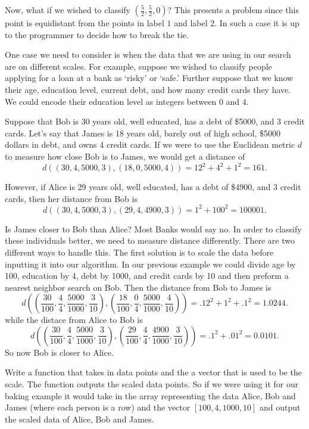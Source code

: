 Now, what if we wished to classify $(\frac{5}{2},\frac{5}{2},0)$?  
This presents a problem since this point is equidistant from the points in label $1$ and label $2$.  
In such a case it is up to the programmer to decide how to break the tie.

One case we need to consider is when the data that we are using in our search are on different scales. 
For example, suppose we wished to classify people applying for a loan at a bank as `risky' or `safe.'  
Further suppose that we know their age, education level, current debt, and how many credit cards they have.  
We could encode their education level as integers between $0$ and $4$.

Suppose that Bob is 30 years old, well educated, has a debt of \$5000, and 3 credit cards.  
Let's say that James is 18 years old, barely out of high school, \$5000 dollars in debt, and owns 4 credit cards.  
If we were to use the Euclidean metric $d$ to measure how close Bob is to James, we would get a distance of
\[
d((30,4,5000,3),(18,0,5000,4)) = 12^2 + 4^2 + 1^2 = 161.
\]

However, if Alice is 29 years old, well educated, has a debt of \$4900, and 3 credit cards, then her distance from Bob is
\[
d((30,4,5000,3),(29,4,4900,3)) = 1^2 + 100^2 = 100001.
\]

Is James closer to Bob than Alice?  Most Banks would say no.  
In order to classify these individuals better, we need to measure distance differently. 
There are two different ways to handle this. 
The first solution is to scale the data before inputting it into our algorithm. 
In our previous example we could divide age by 100, education by 4, debt by 1000, and credit cards by 10 and then preform a nearest neighbor search on Bob. 
Then the distance from Bob to James is 
\[
d((\frac{30}{100},\frac{4}{4},\frac{5000}{1000},\frac{3}{10}),(\frac{18}{100},\frac{0}{4},\frac{5000}{1000},\frac{4}{10})) = .12^2 + 1^2 + .1^2 = 1.0244.
\]
while the distace from Alice to Bob is
\[
d((\frac{30}{100},\frac{4}{4},\frac{5000}{1000},\frac{3}{10}),(\frac{29}{100},\frac{4}{4},\frac{4900}{1000},\frac{3}{10})) = .1^2 + .01^2 = 0.0101.
\]
So now Bob is closer to Alice.

\begin{problem}

Write a function that takes in data points and the a vector that is used to be the scale. 
The function outputs the scaled data points. 
So if we were using it for our baking example it would take in the array representing the data Alice, Bob and James (where each person is a row) and the vector $[100,4,1000,10]$ and output the scaled data of Alice, Bob and James.

\end{problem}

